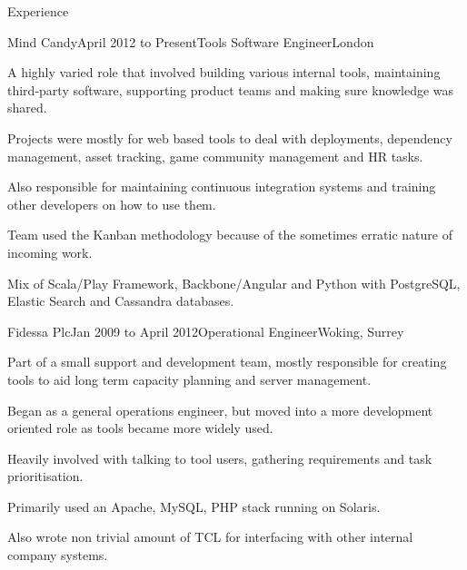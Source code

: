 \documentclass{resume} %
\begin{document}

\begin{rSection}{Experience}

  \begin{rExperience}{Mind Candy}{April 2012 to Present}{Tools Software Engineer}{London}
  \item A highly varied role that involved building various internal tools, maintaining third-party software, supporting product teams and making sure knowledge was shared.
  \item Projects were mostly for web based tools to deal with deployments, dependency management, asset tracking, game community management and HR tasks.
  \item Also responsible for maintaining continuous integration systems and training other developers on how to use them.
  \item Team used the Kanban methodology because of the sometimes erratic nature of incoming work.
  \item Mix of Scala/Play Framework, Backbone/Angular and Python with PostgreSQL, Elastic Search and Cassandra databases.
  \end{rExperience}


  \begin{rExperience}{Fidessa Plc}{Jan 2009 to April 2012}{Operational Engineer}{Woking, Surrey}
  \item Part of a small support and development team, mostly responsible for creating tools to aid long term capacity planning and server management.
  \item Began as a general operations engineer, but moved into a more development oriented role as tools became more widely used.
  \item Heavily involved with talking to tool users, gathering requirements and task prioritisation.
  \item Primarily used an Apache, MySQL, PHP stack running on Solaris.
  \item Also wrote non trivial amount of TCL for interfacing with other internal company systems.
  \end{rExperience}



\end{rSection}
\end{document}

